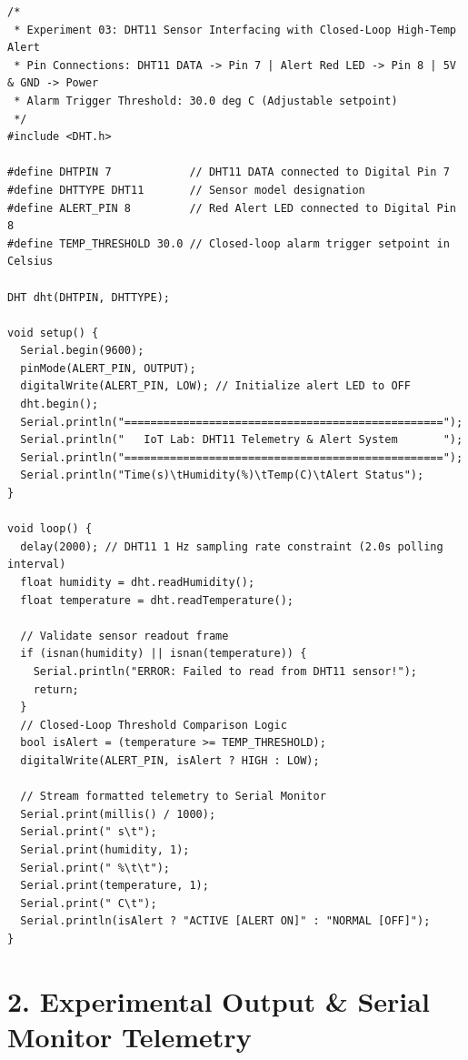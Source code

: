 \documentclass[10pt,a4paper]{article}
\begin{document}
\begin{lstlisting}[style=bwArduino, title={\textbf{Listing 3.1: Microcontroller Firmware for DHT11 Telemetry and Closed-Loop Alert Actuation.}}]
/*
 * Experiment 03: DHT11 Sensor Interfacing with Closed-Loop High-Temp Alert
 * Pin Connections: DHT11 DATA -> Pin 7 | Alert Red LED -> Pin 8 | 5V & GND -> Power
 * Alarm Trigger Threshold: 30.0 deg C (Adjustable setpoint)
 */
#include <DHT.h>

#define DHTPIN 7            // DHT11 DATA connected to Digital Pin 7
#define DHTTYPE DHT11       // Sensor model designation
#define ALERT_PIN 8         // Red Alert LED connected to Digital Pin 8
#define TEMP_THRESHOLD 30.0 // Closed-loop alarm trigger setpoint in Celsius

DHT dht(DHTPIN, DHTTYPE);

void setup() {
  Serial.begin(9600);
  pinMode(ALERT_PIN, OUTPUT);
  digitalWrite(ALERT_PIN, LOW); // Initialize alert LED to OFF
  dht.begin();
  Serial.println("=================================================");
  Serial.println("   IoT Lab: DHT11 Telemetry & Alert System       ");
  Serial.println("=================================================");
  Serial.println("Time(s)\tHumidity(%)\tTemp(C)\tAlert Status");
}

void loop() {
  delay(2000); // DHT11 1 Hz sampling rate constraint (2.0s polling interval)
  float humidity = dht.readHumidity();
  float temperature = dht.readTemperature();

  // Validate sensor readout frame
  if (isnan(humidity) || isnan(temperature)) {
    Serial.println("ERROR: Failed to read from DHT11 sensor!");
    return;
  }
  // Closed-Loop Threshold Comparison Logic
  bool isAlert = (temperature >= TEMP_THRESHOLD);
  digitalWrite(ALERT_PIN, isAlert ? HIGH : LOW);

  // Stream formatted telemetry to Serial Monitor
  Serial.print(millis() / 1000);
  Serial.print(" s\t");
  Serial.print(humidity, 1);
  Serial.print(" %\t\t");
  Serial.print(temperature, 1);
  Serial.print(" C\t");
  Serial.println(isAlert ? "ACTIVE [ALERT ON]" : "NORMAL [OFF]");
}
\end{lstlisting}

\vspace{0.06cm}

\section*{2. Experimental Output \& Serial Monitor Telemetry}
\end{document}
